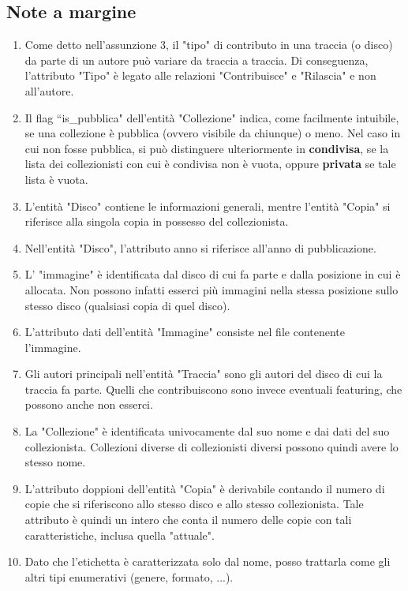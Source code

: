\documentclass{article}
\begin{document}
\subsection{Note a margine}
\begin{enumerate}
    \item Come detto nell'assunzione 3, il "tipo" di contributo in una traccia (o disco) da parte di un autore può variare da traccia a traccia. Di conseguenza, l'attributo "Tipo" è legato alle relazioni "Contribuisce" e "Rilascia" e non all'autore.
    \item Il flag ``is\_pubblica" dell'entità "Collezione" indica, come facilmente intuibile, se una collezione è pubblica (ovvero visibile da chiunque) o meno. Nel caso in cui non fosse pubblica, si può distinguere ulteriormente in \textbf{condivisa}, se la lista dei collezionisti con cui è condivisa non è vuota, oppure \textbf{privata} se tale lista è vuota.
    \item L'entità "Disco" contiene le informazioni generali, mentre l'entità "Copia" si riferisce alla singola copia in possesso del collezionista.
    \item Nell'entità "Disco", l'attributo anno si riferisce all'anno di pubblicazione.
    \item L' "immagine" è identificata dal disco di cui fa parte e dalla posizione in cui è allocata. Non possono infatti esserci più immagini nella stessa posizione sullo stesso disco (qualsiasi copia di quel disco).
    \item L'attributo dati dell'entità "Immagine" consiste nel file contenente l'immagine.
    \item Gli autori principali nell'entità "Traccia" sono gli autori del disco di cui la traccia fa parte. Quelli che contribuiscono sono invece eventuali featuring, che possono anche non esserci.
    \item La "Collezione" è identificata univocamente dal suo nome e dai dati del suo collezionista. Collezioni diverse di collezionisti diversi possono quindi avere lo stesso nome.
    \item L'attributo doppioni dell'entità "Copia" è derivabile contando il numero di copie che si riferiscono allo stesso disco e allo stesso collezionista. Tale attributo è quindi un intero che conta il numero delle copie con tali caratteristiche, inclusa quella "attuale".
    \item Dato che l'etichetta è caratterizzata solo dal nome, posso trattarla come gli altri tipi enumerativi (genere, formato, ...).
\end{enumerate}
\end{document}
